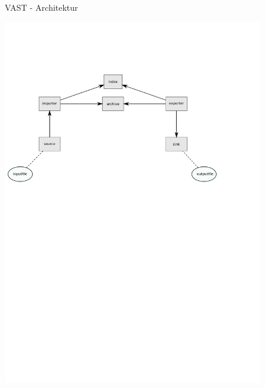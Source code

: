 \documentclass[9pt]{beamer}
\begin{document}
\begin{frame}{VAST - Architektur}{}
	\begin{center}
		\includegraphics[width=0.85\textwidth]{res/vast.pdf}
	\end{center}
\end{frame}
\end{document}
